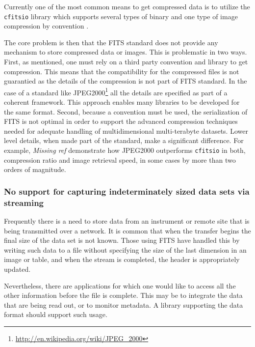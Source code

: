\documentclass[final,authoryear,5p,times,twocolumn]{elsarticle}
\begin{document}
{{Currently one of the most common means to get compressed data is to utilize
the \texttt{cfitsio} library which supports several types of binary and one type of 
image compression by convention \citep[see
e.g.,][\href{http://ascl.net/1010.002}{ascl:1010.002}]{2000ASPC..216..551P, 
2007ASPC..376..483S,2009PASP..121..414P}.


The core problem is then that the FITS standard does not provide any mechanism 
to store compressed data or images.  This is problematic in two ways. First, 
as mentioned, one must rely on a third party convention and library to get compression.
This means that the compatibility for the 
compressed files is not guarantied as the details of the compression is not part of FITS
standard. In the case of a standard like JPEG2000\footnote{\href{http://en.wikipedia.org
/wiki/JPEG\_2000}{http://en.wikipedia.org/wiki/JPEG\_2000}}
all the details are specified as part of a coherent framework. This approach enables
many libraries to be developed for the same format.
Second, because a convention must be used, the serialization of FITS is not optimal 
in order to support the advanced 
compression techniques needed for adequate handling of multidimensional 
multi-terabyte datasets. Lower level details, when made part of the
standard, make a significant difference. For example, 
{\color{red} \textit{Missing ref} \citealt{2014arXiv1403.2801K}} demonstrate 
how JPEG2000 outperforms \texttt{cfitsio} in both, compression ratio and 
image retrieval speed, in some cases by more than two orders of magnitude.


\subsubsection{No support for capturing indeterminately sized data sets via streaming}


Frequently there is a need to store data from an instrument or remote
site that is being transmitted over a network. It is common that when
the transfer begins the final size of the data set is not known. Those
using FITS have handled this by writing such data to a file without
specifying the size of the last dimension in an image or table, and
when the stream is completed, the header is appropriately updated.


Nevertheless, there are applications for which one would like to
access all the other information before the file is complete. This may
be to integrate the data that are being read out, or to monitor
metadata. A library supporting the data format should support such
usage.


}}
\end{document}
